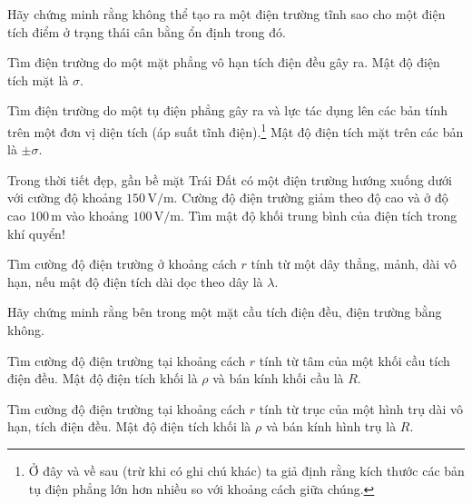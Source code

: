  Hãy chứng minh rằng không thể tạo ra một điện trường tĩnh sao cho một điện tích điểm ở trạng thái cân bằng ổn định trong đó. 

 Tìm điện trường do một mặt phẳng vô hạn tích điện đều gây ra. Mật độ điện tích mặt là $\sigma$.


 Tìm điện trường do một tụ điện phẳng gây ra và lực tác dụng lên các bản tính trên một đơn vị diện tích (áp suất tĩnh điện).\footnote{Ở đây và về sau (trừ khi có ghi chú khác) ta giả định rằng kích thước các bản tụ điện phẳng lớn hơn nhiều so với khoảng cách giữa chúng.} Mật độ điện tích mặt trên các bản là $\pm\sigma$.


 Trong thời tiết đẹp, gần bề mặt Trái Đất có một điện trường hướng xuống dưới với cường độ khoảng $150\,\mathrm{V/m}$. Cường độ điện trường giảm theo độ cao và ở độ cao $100\,\mathrm{m}$ vào khoảng $100\,\mathrm{V/m}$. Tìm mật độ khối trung bình của điện tích trong khí quyển!


 Tìm cường độ điện trường ở khoảng cách $r$ tính từ một dây thẳng, mảnh, dài vô hạn, nếu mật độ điện tích dài dọc theo dây là $\lambda$.


 Hãy chứng minh rằng bên trong một mặt cầu tích điện đều, điện trường bằng không.

 Tìm cường độ điện trường tại khoảng cách $r$ tính từ tâm của một khối cầu tích điện đều. Mật độ điện tích khối là $\rho$ và bán kính khối cầu là $R$.


 Tìm cường độ điện trường tại khoảng cách $r$ tính từ trục của một hình trụ dài vô hạn, tích điện đều. Mật độ điện tích khối là $\rho$ và bán kính hình trụ là $R$.


